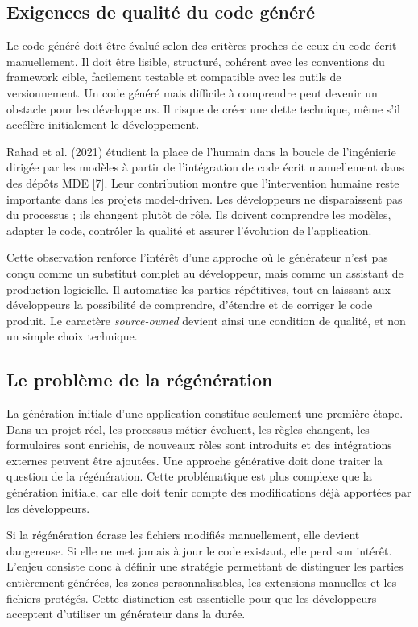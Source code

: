 \subsection{Exigences de qualité du code généré}

Le code généré doit être évalué selon des critères proches de ceux du code écrit manuellement. Il doit être lisible, structuré, cohérent avec les conventions du framework cible, facilement testable et compatible avec les outils de versionnement. Un code généré mais difficile à comprendre peut devenir un obstacle pour les développeurs. Il risque de créer une dette technique, même s'il accélère initialement le développement.

Rahad et al. (2021) étudient la place de l'humain dans la boucle de l'ingénierie dirigée par les modèles à partir de l'intégration de code écrit manuellement dans des dépôts MDE [7]. Leur contribution montre que l'intervention humaine reste importante dans les projets model-driven. Les développeurs ne disparaissent pas du processus ; ils changent plutôt de rôle. Ils doivent comprendre les modèles, adapter le code, contrôler la qualité et assurer l'évolution de l'application.

Cette observation renforce l'intérêt d'une approche où le générateur n'est pas conçu comme un substitut complet au développeur, mais comme un assistant de production logicielle. Il automatise les parties répétitives, tout en laissant aux développeurs la possibilité de comprendre, d'étendre et de corriger le code produit. Le caractère \textit{source-owned} devient ainsi une condition de qualité, et non un simple choix technique.


\subsection{Le problème de la régénération}

La génération initiale d'une application constitue seulement une première étape. Dans un projet réel, les processus métier évoluent, les règles changent, les formulaires sont enrichis, de nouveaux rôles sont introduits et des intégrations externes peuvent être ajoutées. Une approche générative doit donc traiter la question de la régénération. Cette problématique est plus complexe que la génération initiale, car elle doit tenir compte des modifications déjà apportées par les développeurs.

Si la régénération écrase les fichiers modifiés manuellement, elle devient dangereuse. Si elle ne met jamais à jour le code existant, elle perd son intérêt. L'enjeu consiste donc à définir une stratégie permettant de distinguer les parties entièrement générées, les zones personnalisables, les extensions manuelles et les fichiers protégés. Cette distinction est essentielle pour que les développeurs acceptent d'utiliser un générateur dans la durée.

